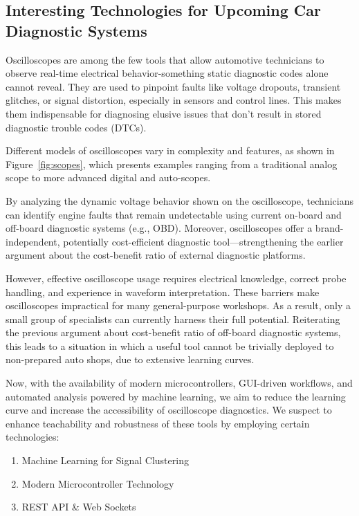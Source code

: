\subsection{Interesting Technologies for Upcoming Car Diagnostic Systems}
Oscilloscopes are among the few tools that allow automotive technicians to observe real-time electrical behavior-something static diagnostic codes alone cannot reveal. 
They are used to pinpoint faults like voltage dropouts, transient glitches, or signal distortion, especially in sensors and control lines. 
This makes them indispensable for diagnosing elusive issues that don’t result in stored diagnostic trouble codes (DTCs).

Different models of oscilloscopes vary in complexity and features, as shown in Figure~\ref{fig:scopes}, 
which presents examples ranging from a traditional analog scope to more advanced digital and auto-scopes.

By analyzing the dynamic voltage behavior shown on the oscilloscope, technicians can identify engine faults that remain undetectable using current on-board and off-board diagnostic systems (e.g., OBD).
Moreover, oscilloscopes offer a brand-independent, potentially cost-efficient diagnostic tool—strengthening the earlier argument about the cost-benefit ratio of external diagnostic platforms.

However, effective oscilloscope usage requires electrical knowledge, correct probe handling, and experience in waveform interpretation. 
These barriers make oscilloscopes impractical for many general-purpose workshops. 
As a result, only a small group of specialists can currently harness their full potential. 
Reiterating the previous argument about cost-benefit ratio of off-board diagnostic systems, 
this leads to a situation in which a useful tool cannot be trivially deployed to non-prepared auto shops, due to extensive learning curves.

Now, with the availability of modern microcontrollers, GUI-driven workflows, and automated analysis powered by machine learning, 
we aim to reduce the learning curve and increase the accessibility of oscilloscope diagnostics. 
We suspect to enhance teachability and robustness of these tools by employing certain technologies:
\begin{enumerate}[label=\alph*)]
  \item Machine Learning for Signal Clustering
  \item Modern Microcontroller Technology
  \item REST API \& Web Sockets
\end{enumerate}

